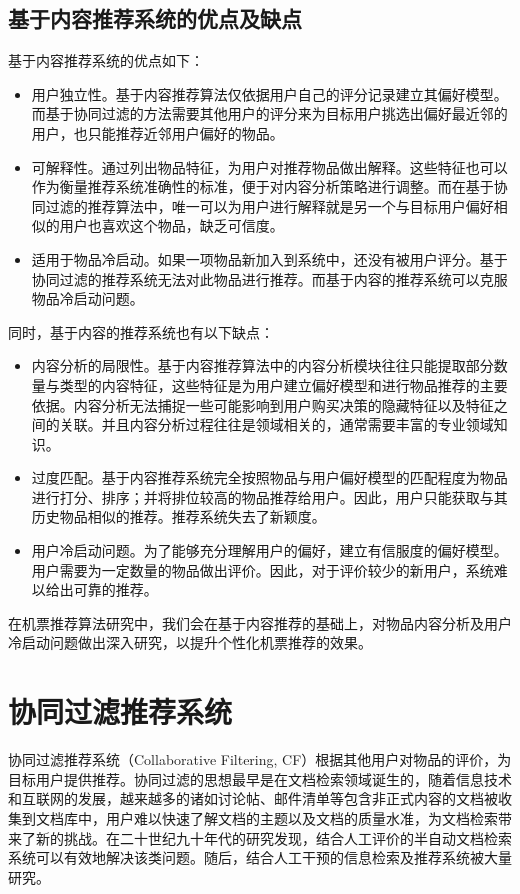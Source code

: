 \subsection{基于内容推荐系统的优点及缺点}

基于内容推荐系统的优点如下：

\begin{itemize}
 \item 用户独立性。基于内容推荐算法仅依据用户自己的评分记录建立其偏好模型。而基于协同过滤的方法需要其他用户的评分来为目标用户挑选出偏好最近邻的用户，也只能推荐近邻用户偏好的物品。
 \item 可解释性。通过列出物品特征，为用户对推荐物品做出解释。这些特征也可以作为衡量推荐系统准确性的标准，便于对内容分析策略进行调整。而在基于协同过滤的推荐算法中，唯一可以为用户进行解释就是另一个与目标用户偏好相似的用户也喜欢这个物品，缺乏可信度。
 \item 适用于物品冷启动。如果一项物品新加入到系统中，还没有被用户评分。基于协同过滤的推荐系统无法对此物品进行推荐。而基于内容的推荐系统可以克服物品冷启动问题。
\end{itemize}

同时，基于内容的推荐系统也有以下缺点：

\begin{itemize}
	\item 内容分析的局限性。基于内容推荐算法中的内容分析模块往往只能提取部分数量与类型的内容特征，这些特征是为用户建立偏好模型和进行物品推荐的主要依据。内容分析无法捕捉一些可能影响到用户购买决策的隐藏特征以及特征之间的关联。并且内容分析过程往往是领域相关的，通常需要丰富的专业领域知识。
	\item 过度匹配。基于内容推荐系统完全按照物品与用户偏好模型的匹配程度为物品进行打分、排序；并将排位较高的物品推荐给用户。因此，用户只能获取与其历史物品相似的推荐。推荐系统失去了新颖度。
	\item 用户冷启动问题。为了能够充分理解用户的偏好，建立有信服度的偏好模型。用户需要为一定数量的物品做出评价。因此，对于评价较少的新用户，系统难以给出可靠的推荐。
\end{itemize}

在机票推荐算法研究中，我们会在基于内容推荐的基础上，对物品内容分析及用户冷启动问题做出深入研究，以提升个性化机票推荐的效果。


\section{协同过滤推荐系统}

协同过滤推荐系统（Collaborative Filtering, CF）根据其他用户对物品的评价，为目标用户提供推荐。协同过滤的思想最早是在文档检索领域诞生的\cite{schafer2007collaborative}，随着信息技术和互联网的发展，越来越多的诸如讨论帖、邮件清单等包含非正式内容的文档被收集到文档库中，用户难以快速了解文档的主题以及文档的质量水准，为文档检索带来了新的挑战。在二十世纪九十年代的研究发现，结合人工评价的半自动文档检索系统可以有效地解决该类问题。随后，结合人工干预的信息检索及推荐系统被大量研究\cite{goldberg1992using}。

